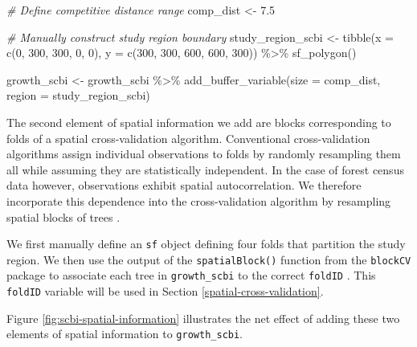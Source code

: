 \documentclass[12pt]{article}
\newenvironment{Shaded}{\begin{snugshade}}{\end{snugshade}}
\newcommand{\AttributeTok}[1]{\textcolor[rgb]{0.77,0.63,0.00}{#1}}
\newcommand{\CommentTok}[1]{\textcolor[rgb]{0.56,0.35,0.01}{\textit{#1}}}
\newcommand{\DecValTok}[1]{\textcolor[rgb]{0.00,0.00,0.81}{#1}}
\newcommand{\FloatTok}[1]{\textcolor[rgb]{0.00,0.00,0.81}{#1}}
\newcommand{\FunctionTok}[1]{\textcolor[rgb]{0.00,0.00,0.00}{#1}}
\newcommand{\NormalTok}[1]{#1}
\newcommand{\OtherTok}[1]{\textcolor[rgb]{0.56,0.35,0.01}{#1}}
\newcommand{\SpecialCharTok}[1]{\textcolor[rgb]{0.00,0.00,0.00}{#1}}
\begin{document}
\begin{Shaded}
\begin{Highlighting}[]
\CommentTok{\# Define competitive distance range}
\NormalTok{comp\_dist }\OtherTok{\textless{}{-}} \FloatTok{7.5}

\CommentTok{\# Manually construct study region boundary}
\NormalTok{study\_region\_scbi }\OtherTok{\textless{}{-}} \FunctionTok{tibble}\NormalTok{(}\AttributeTok{x =} \FunctionTok{c}\NormalTok{(}\DecValTok{0}\NormalTok{, }\DecValTok{300}\NormalTok{, }\DecValTok{300}\NormalTok{, }\DecValTok{0}\NormalTok{, }\DecValTok{0}\NormalTok{), }\AttributeTok{y =} \FunctionTok{c}\NormalTok{(}\DecValTok{300}\NormalTok{, }\DecValTok{300}\NormalTok{, }\DecValTok{600}\NormalTok{,}
    \DecValTok{600}\NormalTok{, }\DecValTok{300}\NormalTok{)) }\SpecialCharTok{\%\textgreater{}\%}
    \FunctionTok{sf\_polygon}\NormalTok{()}

\NormalTok{growth\_scbi }\OtherTok{\textless{}{-}}\NormalTok{ growth\_scbi }\SpecialCharTok{\%\textgreater{}\%}
    \FunctionTok{add\_buffer\_variable}\NormalTok{(}\AttributeTok{size =}\NormalTok{ comp\_dist, }\AttributeTok{region =}\NormalTok{ study\_region\_scbi)}
\end{Highlighting}
\end{Shaded}

The second element of spatial information we add are blocks
corresponding to folds of a spatial cross-validation algorithm.
Conventional cross-validation algorithms assign individual observations
to folds by randomly resampling them all while assuming they are
statistically independent. In the case of forest census data however,
observations exhibit spatial autocorrelation. We therefore incorporate
this dependence into the cross-validation algorithm by resampling
spatial blocks of trees \citep[
\citet{pohjankukka_estimating_2017}]{roberts_cross-validation_2017}.

We first manually define an \texttt{sf} object defining four folds that
partition the study region. We then use the output of the
\texttt{spatialBlock()} function from the \texttt{blockCV} package to
associate each tree in \texttt{growth\_scbi} to the correct
\texttt{foldID} \citep{valavi_blockcv_2019}. This \texttt{foldID}
variable will be used in Section \ref{spatial-cross-validation}.

Figure \ref{fig:scbi-spatial-information} illustrates the net effect of
adding these two elements of spatial information to
\texttt{growth\_scbi}.
\end{document}
